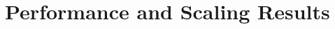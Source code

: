 \documentclass[12pt]{article} %
\begin{document}

\section{Performance and Scaling Results}
\end{document}
